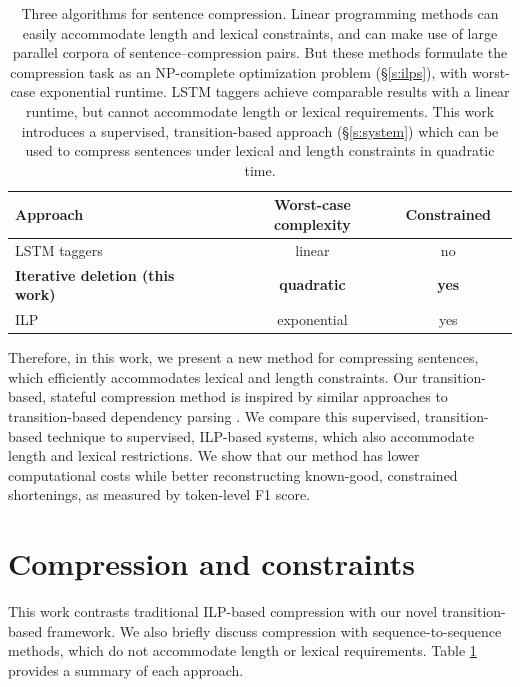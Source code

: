 \documentclass[11pt,a4paper]{article}
\begin{document}
\begin{table}[htb!]
\begin{tabular}{lccc}
\textbf{Approach} & \textbf{Worst-case complexity} & \textbf{Constrained}  \\ \hline
LSTM taggers \cite{filippova2015sentence}   & linear              & no         \\   
\textbf{Iterative deletion (this work)}  & \textbf{quadratic}     &      \textbf{yes}   \\
ILP    \cite{filippova2013overcoming,Wang2017CanSH}       &   exponential    & yes      \\
\end{tabular}
\caption{Three algorithms for sentence compression. Linear programming methods \cite{clarke2008global,filippova2013overcoming,Wang2017CanSH} can easily accommodate length and lexical constraints, and can make use of large parallel corpora of sentence--compression pairs. But these methods formulate the compression task as an NP-complete optimization problem (\S\ref{s:ilps}), with worst-case exponential runtime. LSTM taggers \cite{filippova2015sentence} achieve comparable results with a linear runtime, but cannot accommodate length or lexical requirements. This work introduces a supervised, transition-based approach (\S\ref{s:system}) which can be used to compress sentences under lexical and length constraints in quadratic time.} 
\label{t:algos}
\end{table}


Therefore, in this work, we present a new method for compressing sentences, which efficiently accommodates lexical and length constraints. Our transition-based, stateful compression method is inspired by similar approaches to transition-based dependency parsing \cite{nivre2003,D14-1082}. We compare this supervised, transition-based technique to supervised, ILP-based systems, which also accommodate length and lexical restrictions. We show that our method has lower computational costs while better reconstructing known-good, constrained shortenings, as measured by token-level F1 score. 

\section{Compression and constraints}

This work contrasts traditional ILP-based compression with our novel transition-based framework. We also briefly discuss compression with sequence-to-sequence methods, which do not accommodate length or lexical requirements. Table \ref{t:algos} provides a summary of each approach.
\end{document}
